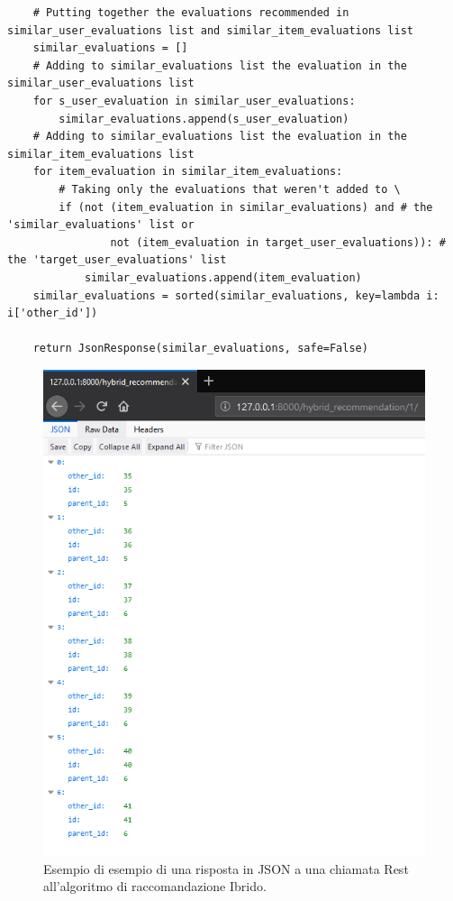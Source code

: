 \begin{lstlisting}
	# Putting together the evaluations recommended in similar_user_evaluations list and similar_item_evaluations list
	similar_evaluations = []
	# Adding to similar_evaluations list the evaluation in the similar_user_evaluations list
	for s_user_evaluation in similar_user_evaluations:
		similar_evaluations.append(s_user_evaluation)
	# Adding to similar_evaluations list the evaluation in the similar_item_evaluations list
	for item_evaluation in similar_item_evaluations:
		# Taking only the evaluations that weren't added to \
		if (not (item_evaluation in similar_evaluations) and # the 'similar_evaluations' list or
				not (item_evaluation in target_user_evaluations)): # the 'target_user_evaluations' list
			similar_evaluations.append(item_evaluation)
	similar_evaluations = sorted(similar_evaluations, key=lambda i: i['other_id'])

	return JsonResponse(similar_evaluations, safe=False)
\end{lstlisting}

\begin{figure}[ht!]
	\centering
	\includegraphics[scale=0.5]{images/CF_Hybrid_test.png}
	\caption{Esempio di esempio di una risposta in JSON a una chiamata Rest all'algoritmo di raccomandazione Ibrido.}
	\label{fig:CF_Hybrid_resp_json}
\end{figure}